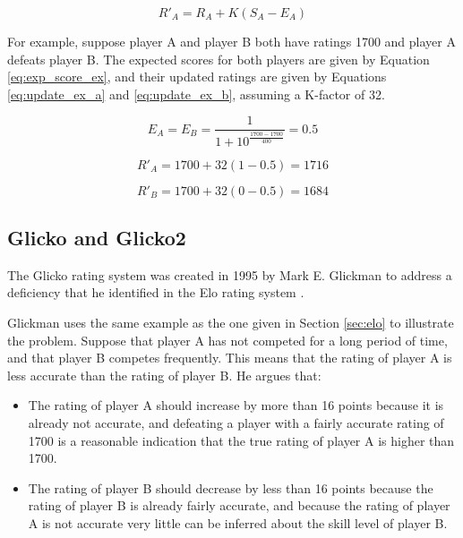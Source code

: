 \begin{equation} \label{eq:update}
R'_A = R_A + K \left( S_A - E_A \right)
\end{equation}

For example, suppose player A and player B both have ratings 1700 and player A defeats player B.
The expected scores for both players are given by Equation \ref{eq:exp_score_ex}, and their updated ratings are given by Equations \ref{eq:update_ex_a} and \ref{eq:update_ex_b}, assuming a K-factor of 32.

\begin{equation} \label{eq:exp_score_ex}
E_A = E_B = \frac{1}{1 + 10^\frac{1700 - 1700}{400}} = 0.5
\end{equation}

\begin{equation} \label{eq:update_ex_a}
R'_A = 1700 + 32 \left( 1 - 0.5 \right) = 1716
\end{equation}

\begin{equation} \label{eq:update_ex_b}
R'_B = 1700 + 32 \left( 0 - 0.5 \right) = 1684
\end{equation}

\subsection{Glicko and Glicko2}
\label{sec:glicko}
The Glicko rating system was created in 1995 by Mark E. Glickman to address a deficiency that he identified in the Elo rating system \cite{glicko}.

Glickman uses the same example as the one given in Section \ref{sec:elo} to illustrate the problem.
Suppose that player A has not competed for a long period of time, and that player B competes frequently.
This means that the rating of player A is less accurate than the rating of player B.
He argues that:

\begin{itemize}
	\item{The rating of player A should increase by more than 16 points because it is already not accurate, and defeating a player with a fairly accurate rating of 1700 is a reasonable indication that the true rating of player A is higher than 1700.}
	\item{The rating of player B should decrease by less than 16 points because the rating of player B is already fairly accurate, and because the rating of player A is not accurate very little can be inferred about the skill level of player B.}
\end{itemize}

